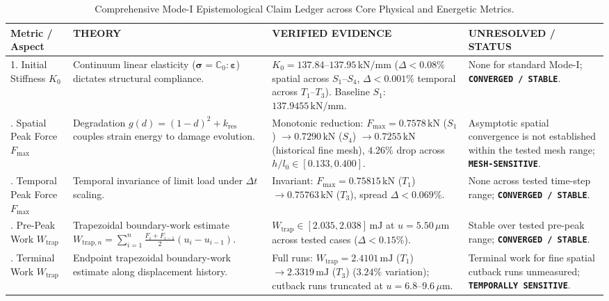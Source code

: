 \begin{table}[htbp]
\centering
\caption{Comprehensive Mode-I Epistemological Claim Ledger across Core Physical and Energetic Metrics.}
\label{tab:thesis_claim_ledger}
\scriptsize
\setlength{\tabcolsep}{2.5pt}
\renewcommand{\arraystretch}{0.92}
\begin{tabularx}{\textwidth}{p{2.2cm}p{3.5cm}p{4.2cm}X}
\toprule
\textbf{Metric / Aspect} & \textbf{THEORY} & \textbf{VERIFIED EVIDENCE} & \textbf{UNRESOLVED / STATUS} \\
\midrule
1. Initial Stiffness $K_0$ & Continuum linear elasticity ($\boldsymbol{\sigma} = \mathbb{C}_0 : \boldsymbol{\varepsilon}$) dictates structural compliance. & $K_0 = 137.84$--$137.95\,\text{kN/mm}$ ($\Delta < 0.08\%$ spatial across $S_1$--$S_4$, $\Delta < 0.001\%$ temporal across $T_1$--$T_3$). Baseline $S_1$: $137.9455\,\text{kN/mm}$. & None for standard Mode-I; \textbf{\texttt{CONVERGED / STABLE}}. \\
\addlinespace
2. Spatial Peak Force $F_{\max}$ & Degradation $g(d) = (1-d)^2 + k_{\mathrm{res}}$ couples strain energy to damage evolution. & Monotonic reduction: $F_{\max} = 0.7578\,\text{kN}$ ($S_1$) $\to 0.7290\,\text{kN}$ ($S_4$) $\to 0.7255\,\text{kN}$ (historical fine mesh), $4.26\%$ drop across $h/l_0 \in [0.133, 0.400]$. & Asymptotic spatial convergence is not established within the tested mesh range; \textbf{\texttt{MESH-SENSITIVE}}. \\
\addlinespace
3. Temporal Peak Force $F_{\max}$ & Temporal invariance of limit load under $\Delta t$ scaling. & Invariant: $F_{\max} = 0.75815\,\text{kN}$ ($T_1$) $\to 0.75763\,\text{kN}$ ($T_3$), spread $\Delta < 0.069\%$. & None across tested time-step range; \textbf{\texttt{CONVERGED / STABLE}}. \\
\addlinespace
4. Pre-Peak Work $W_{\mathrm{trap}}$ & Trapezoidal boundary-work estimate $W_{\mathrm{trap},n} = \sum_{i=1}^{n} \frac{F_i+F_{i-1}}{2}(u_i-u_{i-1})$. & $W_{\mathrm{trap}} \in [2.035, 2.038]\,\text{mJ}$ at $u = 5.50\,\mu\text{m}$ across tested cases ($\Delta < 0.15\%$). & Stable over tested pre-peak range; \textbf{\texttt{CONVERGED / STABLE}}. \\
\addlinespace
5. Terminal Work $W_{\mathrm{trap}}$ & Endpoint trapezoidal boundary-work estimate along displacement history. & Full runs: $W_{\mathrm{trap}} = 2.4101\,\text{mJ}$ ($T_1$) $\to 2.3319\,\text{mJ}$ ($T_3$) ($3.24\%$ variation); cutback runs truncated at $u=6.8$--$9.6\,\mu\text{m}$. & Terminal work for fine spatial cutback runs unmeasured; \textbf{\texttt{TEMPORALLY SENSITIVE}}. \\

\end{tabularx}
\end{table}
